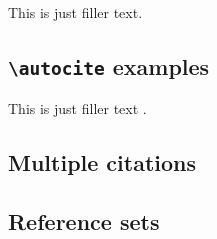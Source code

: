 \documentclass[a4paper]{article}
\newcommand{\cmd}[1]{\texttt{\textbackslash #1}}
\begin{document}
This is just filler text.\supercite{companion}

\subsection*{\cmd{autocite} examples}


This is just filler text \autocite{companion}.

\subsection*{Multiple citations}


\cite{companion,augustine,bertram,cotton,hammond,massa,murray}

\subsection*{Reference sets}


\cite{set,hammond,stdmodel,massa,murray}


\cite{stdmodel:glashow,set:yoon,stdmodel:salam,set:aksin}


\cite{set,stdmodel}


\clearpage
\printbibliography
\end{document}
